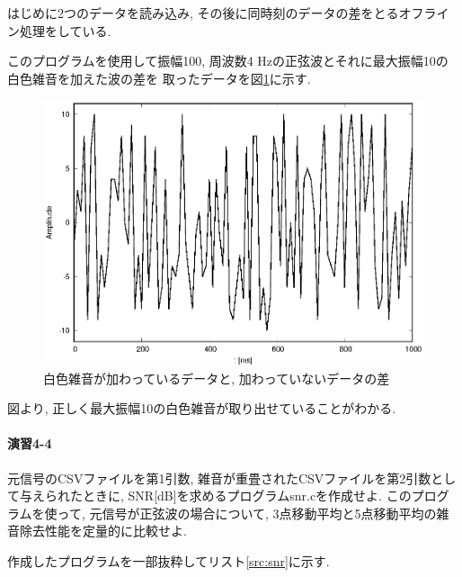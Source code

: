 \documentclass[titlepage]{jsarticle}
\begin{document}
        はじめに2つのデータを読み込み, その後に同時刻のデータの差をとるオフライン処理をしている.

        このプログラムを使用して振幅100, 周波数4 Hzの正弦波とそれに最大振幅10の白色雑音を加えた波の差を
        取ったデータを図\ref{fig:diff}に示す.

        \begin{figure}[h]
            \centering
            \includegraphics[width=0.8\hsize]{images/diff.eps}
            \caption{白色雑音が加わっているデータと, 加わっていないデータの差}
            \label{fig:diff}
        \end{figure}

        図より, 正しく最大振幅10の白色雑音が取り出せていることがわかる.

    \paragraph{演習4-4} 元信号のCSVファイルを第1引数, 雑音が重畳されたCSVファイルを第2引数として与えられたときに,
    SNR[dB]を求めるプログラムsnr.cを作成せよ. このプログラムを使って,
    元信号が正弦波の場合について, 3点移動平均と5点移動平均の雑音除去性能を定量的に比較せよ.
        
        作成したプログラムを一部抜粋してリスト\ref{src:snr}に示す.
\end{document}
